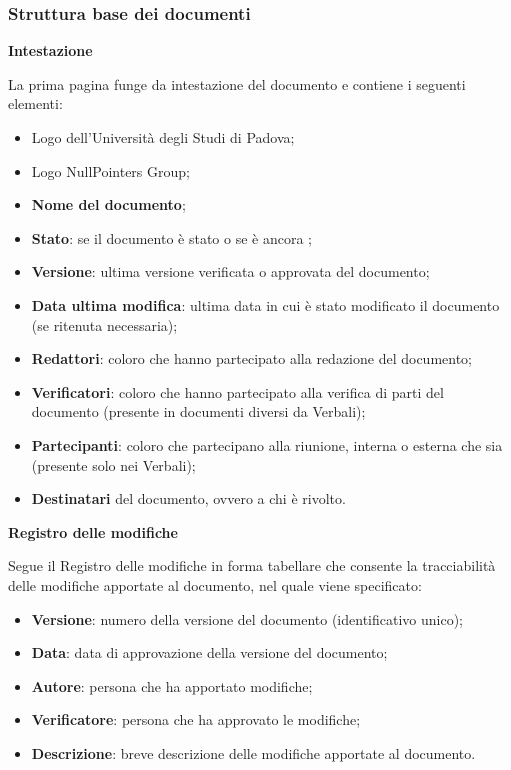 \subsubsection{Struttura base dei documenti}
\label{sec: struttura-base-doc}
\begin{center}
\textbf{Intestazione}
\end{center}
\vspace{-0.5em}
La prima pagina funge da intestazione del documento e contiene i seguenti elementi:
\begin{itemize}[itemsep=3pt, parsep=1pt, label=$\scriptstyle\bullet$]
        \item Logo dell'Università degli Studi di Padova;
        \item Logo NullPointers Group;
        \item \textbf{Nome del documento};
        \item \textbf{Stato}: se il documento è stato  o se è ancora ;
        \item \textbf{Versione}: ultima versione verificata o approvata del documento;
        \item \textbf{Data ultima modifica}: ultima data in cui è stato modificato il documento (se ritenuta necessaria);
        \item \textbf{Redattori}: coloro che hanno partecipato alla redazione del documento;
        \item \textbf{Verificatori}: coloro che hanno partecipato alla verifica di parti del documento (presente in documenti diversi da Verbali);
        \item \textbf{Partecipanti}: coloro che partecipano alla riunione, interna o esterna che sia (presente solo nei Verbali);
        \item \textbf{Destinatari} del documento, ovvero a chi è rivolto.
    \end{itemize}

\label{sec:registro-modifiche}
\begin{center}
\textbf{Registro delle modifiche}
\end{center}
\vspace{-0.5em}
Segue il Registro delle modifiche in forma tabellare che consente la tracciabilità delle modifiche apportate al documento, nel quale viene specificato: 
    \begin{itemize}[itemsep=3pt, parsep=1pt, label=$\scriptstyle\bullet$]
        \item \textbf{Versione}: numero della versione del documento (identificativo unico);
        \item \textbf{Data}: data di approvazione della versione del documento;
        \item \textbf{Autore}: persona che ha apportato modifiche;
        \item \textbf{Verificatore}: persona che ha approvato le modifiche;
        \item \textbf{Descrizione}: breve descrizione delle modifiche apportate al documento.
    \end{itemize}

